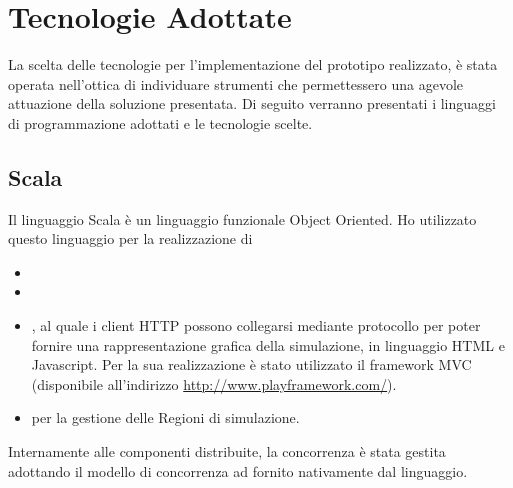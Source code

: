 \chapter{Tecnologie Adottate}

La scelta delle tecnologie per l'implementazione del prototipo realizzato, è stata operata nell'ottica di individuare strumenti che permettessero una agevole attuazione della soluzione presentata. 
Di seguito verranno presentati i linguaggi di programmazione adottati e le tecnologie scelte.

	\section{Scala}
		Il linguaggio Scala è un linguaggio funzionale Object Oriented. Ho utilizzato questo linguaggio per la realizzazione di 
			\begin{itemize}
				\item {}
				\item {}
				\item {}, al quale i client HTTP possono collegarsi mediante protocollo  per poter fornire una rappresentazione grafica della simulazione, in linguaggio HTML e Javascript. Per la sua realizzazione è stato utilizzato il framework MVC  (disponibile all'indirizzo \url{http://www.playframework.com/}).
				\item {} per la gestione delle Regioni di simulazione.
			\end{itemize}
		Internamente alle componenti distribuite, la concorrenza è stata gestita adottando il modello di concorrenza ad  fornito nativamente dal linguaggio. 
		
